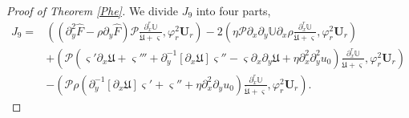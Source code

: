 \documentclass[10pt,a4paper]{amsart}
\begin{document}
\begin{proof}[Proof of Theorem \ref{Phe}]
We divide $J_{9}$ into four parts,
\begin{align}\label{J9}
J_{9}
=&\left((\partial_{y}^{2}\hat{F}-\rho\partial_{y}\hat{F})\mathcal{P}\frac{\partial_{x}^{r}\mathbb{U}}{\dot{\mathfrak{U}}+\varsigma},\varphi_{r}^{2}\mathbf{U}_{r}\right)
  -2\left(\eta\mathcal{P}\partial_{x}\partial_{y}\mathbb{U}\partial_{x}\rho\frac{\partial_{x}^{r}\mathbb{U}}{\dot{\mathfrak{U}}+\varsigma},\varphi_{r}^{2}\mathbf{U}_{r}\right)\\
 &+\left(\mathcal{P}\left(\varsigma'\partial_{x}\mathfrak{U}+\varsigma'''+\partial_{y}^{-1}[\partial_{x}\mathfrak{U}]\varsigma''-\varsigma\partial_{x}\partial_{y}\mathfrak{U}+\eta\partial_{x}^{2}\partial_{y}^{2}u_{0}\right)\frac{\partial_{x}^{r}\mathbb{U}}{\dot{\mathfrak{U}}+\varsigma},\varphi_{r}^{2}\mathbf{U}_{r}\right)\nonumber\\
 &-\left(\mathcal{P}\rho\left(\partial_{y}^{-1}[\partial_{x}\mathfrak{U}]\varsigma'+\varsigma''+\eta\partial_{x}^{2}\partial_{y}u_{0}\right)\frac{\partial_{x}^{r}\mathbb{U}}{\dot{\mathfrak{U}}+\varsigma},\varphi_{r}^{2}\mathbf{U}_{r}\right).\nonumber
\end{align}


\end{proof}
\end{document}
